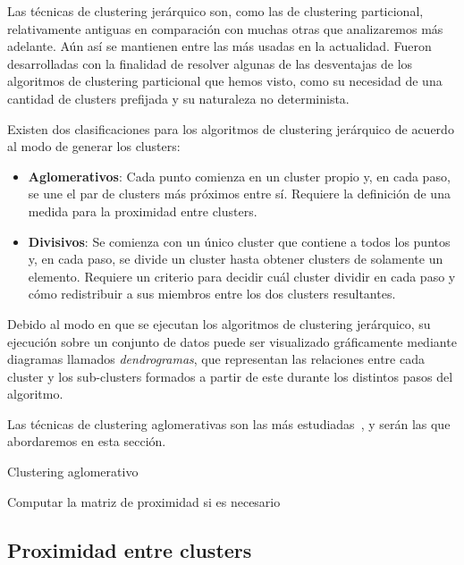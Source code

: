 Las técnicas de clustering jerárquico son, como las de clustering particional, relativamente antiguas en comparación con muchas otras que analizaremos más adelante.
Aún así se mantienen entre las más usadas en la actualidad.
Fueron desarrolladas con la finalidad de resolver algunas de las desventajas de los algoritmos de clustering particional que hemos visto, como su necesidad de una cantidad de clusters prefijada y su naturaleza no determinista.

Existen dos clasificaciones para los algoritmos de clustering jerárquico de acuerdo al modo de generar los clusters:

\begin{itemize}
    \item \textbf{Aglomerativos}: Cada punto comienza en un cluster propio y, en cada paso, se une el par de clusters más próximos entre sí.
    Requiere la definición de una medida para la proximidad entre clusters.
    \item \textbf{Divisivos}: Se comienza con un único cluster que contiene a todos los puntos y, en cada paso, se divide un cluster hasta obtener clusters de solamente un elemento.
    Requiere un criterio para decidir cuál cluster dividir en cada paso y cómo redistribuir a sus miembros entre los dos clusters resultantes.
\end{itemize}

Debido al modo en que se ejecutan los algoritmos de clustering jerárquico, su ejecución sobre un conjunto de datos puede ser visualizado gráficamente mediante diagramas llamados \textit{dendrogramas}, que representan las relaciones entre cada cluster y los sub-clusters formados a partir de este durante los distintos pasos del algoritmo.

Las técnicas de clustering aglomerativas son las más estudiadas~\cite{Tan05}, y serán las que abordaremos en esta sección.

\begin{algorithm}
    \caption{Clustering aglomerativo}
    \label{algorithm:clusteringAglomerativo}
    Computar la matriz de proximidad si es necesario\;
\end{algorithm}

\subsection{Proximidad entre clusters}\label{subsec:proximidadEntreClusters}

